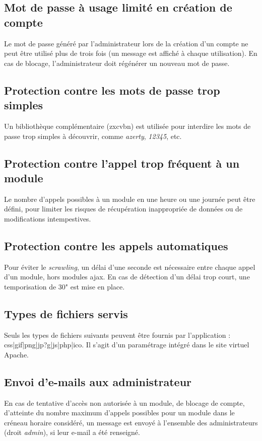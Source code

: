 \subsection{Mot de passe à usage limité en création de compte}
Le mot de passe généré par l'administrateur lors de la création d'un compte ne peut être utilisé plus de trois fois (un message est affiché à chaque utilisation). En cas de blocage, l'administrateur doit régénérer un nouveau mot de passe.

\subsection{Protection contre les mots de passe trop simples}
Un bibliothèque complémentaire (zxcvbn) est utilisée pour interdire les mots de passe trop simples à découvrir, comme \textit{azerty}, \textit{12345}, etc. 

\subsection{Protection contre l'appel trop fréquent à un module}
Le nombre d'appels possibles à un module en une heure ou une journée peut être défini, pour limiter les risques de récupération inappropriée de données ou de modifications intempestives.

\subsection{Protection contre les appels automatiques}
Pour éviter le \textit{scrawling}, un délai d'une seconde est nécessaire entre chaque appel d'un module, hors modules ajax. En cas de détection d'un délai trop court, une temporisation de 30" est mise en place.

\subsection{Types de fichiers servis}
Seuls les types de fichiers suivants peuvent être fournis par l'application : css|gif|png|jp?g|js|php|ico. Il s'agit d'un paramétrage intégré dans le site virtuel Apache.

\subsection{Envoi d'e-mails aux administrateur}
En cas de tentative d'accès non autorisée à un module, de blocage de compte, d'atteinte du nombre maximum d'appels possibles pour un module dans le créneau horaire considéré, un message est envoyé à l'ensemble des administrateurs (droit \textit{admin}), si leur e-mail a été renseigné.

